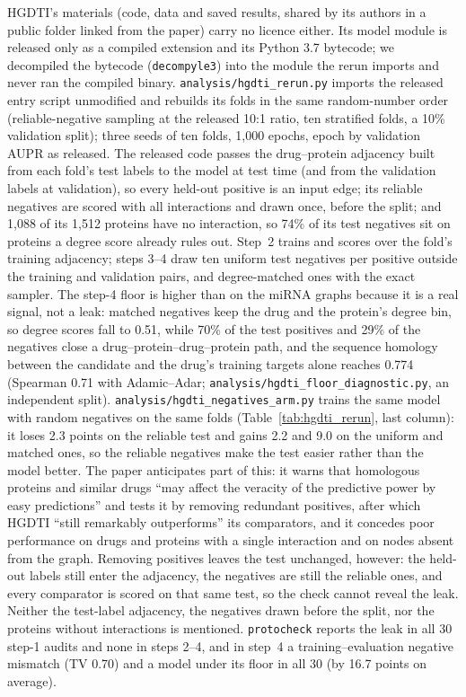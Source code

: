 \documentclass[review]{elsarticle}
\begin{document}


HGDTI's materials (code, data and saved results, shared by its authors in a public folder linked from the
paper) carry no licence either. Its model module is released only as a compiled extension and its Python 3.7
bytecode; we decompiled the bytecode (\texttt{decompyle3}) into the module the rerun imports and never ran the
compiled binary. \texttt{analysis/hgdti\_rerun.py} imports the released entry script unmodified and rebuilds its
folds in the same random-number order (reliable-negative sampling at the released 10:1 ratio, ten stratified
folds, a 10\% validation split); three seeds of ten folds, 1,000 epochs, epoch by validation AUPR as released.
The released code passes the drug--protein adjacency built from each fold's test labels to the model at test
time (and from the validation labels at validation), so every held-out positive is an input edge; its reliable
negatives are scored with all interactions and drawn once, before the split; and 1,088 of its 1,512 proteins
have no interaction, so 74\% of its test negatives sit on proteins a degree score already rules out. Step~2
trains and scores over the fold's training adjacency; steps 3--4 draw ten uniform test negatives per positive
outside the training and validation pairs, and degree-matched ones with the exact sampler. The step-4 floor is
higher than on the miRNA graphs because it is a real signal, not a leak: matched negatives keep the drug and
the protein's degree bin, so degree scores fall to 0.51, while 70\% of the test positives and 29\% of the
negatives close a drug--protein--drug--protein path, and the sequence homology between the candidate and the
drug's training targets alone reaches 0.774 (Spearman 0.71 with Adamic--Adar; \texttt{analysis/hgdti\_floor\_diagnostic.py},
an independent split). \texttt{analysis/hgdti\_negatives\_arm.py} trains the same model with random negatives on
the same folds (Table~\ref{tab:hgdti_rerun}, last column): it loses 2.3 points on the reliable test and gains
2.2 and 9.0 on the uniform and matched ones, so the reliable negatives make the test easier rather than the
model better. The paper anticipates part of this: it warns that homologous proteins and similar drugs ``may affect the
veracity of the predictive power by easy predictions'' and tests it by removing redundant positives, after
which HGDTI ``still remarkably outperforms'' its comparators, and it concedes poor performance on drugs and
proteins with a single interaction and on nodes absent from the graph. Removing positives leaves the test
unchanged, however: the held-out labels still enter the adjacency, the negatives are still the reliable ones,
and every comparator is scored on that same test, so the check cannot reveal the leak. Neither the
test-label adjacency, the negatives drawn before the split, nor the proteins without interactions is
mentioned. \texttt{protocheck} reports the leak in all 30 step-1 audits and none in steps 2--4, and in step~4 a
training--evaluation negative mismatch (TV 0.70) and a model under its floor in all 30 (by 16.7 points on average).
\end{document}
